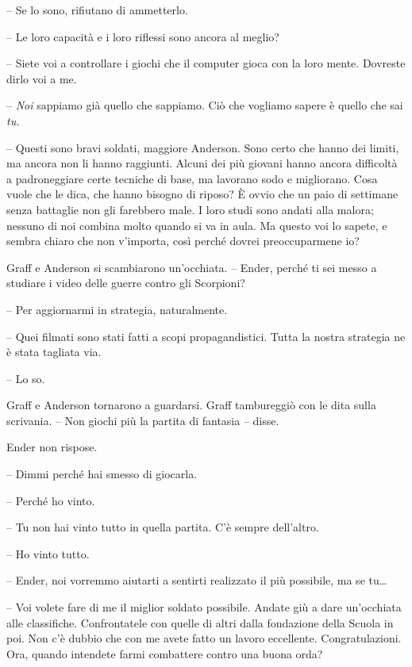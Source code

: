 {-- Se lo sono, rifiutano di ammetterlo.}

{-- Le loro capacità e i loro riflessi sono ancora al meglio?}

{-- Siete voi a controllare i giochi che il computer gioca con la loro
	mente. Dovreste dirlo voi a me.}

{-- \emph{Noi} sappiamo già quello che sappiamo. Ciò che vogliamo sapere
	è quello che sai \emph{tu.}}

{-- Questi sono bravi soldati, maggiore Anderson. Sono certo che hanno
	dei limiti, ma ancora non li hanno raggiunti. Alcuni dei più giovani
	hanno ancora difficoltà a padroneggiare certe tecniche di base, ma
	lavorano sodo e migliorano. Cosa vuole che le dica, che hanno bisogno di
	riposo? È ovvio che un paio di settimane senza battaglie non gli
	farebbero male. I loro studi sono andati alla malora; nessuno di noi
	combina molto quando si va in aula. Ma questo voi lo sapete, e sembra
	chiaro che non v'importa, così perché dovrei preoccuparmene io?}

{Graff e Anderson si scambiarono un'occhiata. -- Ender, perché ti sei
	messo a studiare i video delle guerre contro gli Scorpioni?}

{-- Per aggiornarmi in strategia, naturalmente.}

{-- Quei filmati sono stati fatti a scopi propagandistici. Tutta la
	nostra strategia ne è stata tagliata via.}

{-- Lo so.}

{Graff e Anderson tornarono a guardarsi. Graff tambureggiò con le dita
	sulla scrivania. -- Non giochi più la partita di fantasia -- disse.}

{Ender non rispose.}

{-- Dimmi perché hai smesso di giocarla.}

{-- Perché ho vinto.}

{-- Tu non hai vinto tutto in quella partita. C'è sempre dell'altro.}

{-- Ho vinto tutto.}

{-- Ender, noi vorremmo aiutarti a sentirti realizzato il più possibile,
	ma se tu\ldots{}}

{-- Voi volete fare di me il miglior soldato possibile. Andate giù a
	dare un'occhiata alle classifiche. Confrontatele con quelle di altri
	dalla fondazione della Scuola in poi. Non c'è dubbio che con me avete
	fatto un lavoro eccellente. Congratulazioni. Ora, quando intendete farmi
	combattere contro una buona orda?}

